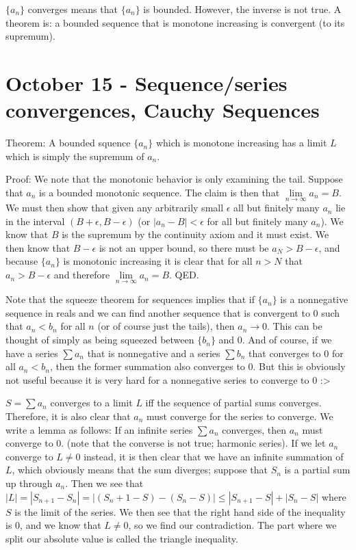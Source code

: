 \documentclass{report}
\begin{document}
$\{a_n\}$ converges means that $\{a_n\}$ is bounded. However, the inverse is not true. A theorem is: a bounded sequence that is monotone increasing is convergent (to its supremum).

\chapter{October 15 - Sequence/series convergences, Cauchy Sequences}

Theorem: A bounded squence $\{a_n\}$ which is monotone increasing has a limit $L$ which is simply the supremum of $a_n$. 

Proof: We note that the monotonic behavior is only examining the tail. Suppose that $a_n$ is a bounded monotonic sequence. The claim is then that $\displaystyle\lim\limits_{n \to\infty}{a_n} = B$. We must then show that given any arbitrarily small $\epsilon$ all but finitely many $a_n$ lie in the interval $(B + \epsilon, B - \epsilon)$ (or $|a_n - B| < \epsilon$ for all but finitely many $a_n$). We know that $B$ is the supremum by the continuity axiom and it must exist. We then know that $B - \epsilon$ is not an upper bound, so there must be $a_N > B - \epsilon$, and because $\{a_n\}$ is monotonic increasing it is clear that for all $n > N$ that $a_n > B - \epsilon$ and therefore $\displaystyle\lim\limits_{n \to\infty}{a_n} = B$. QED.

Note that the squeeze theorem for sequences implies that if $\{a_n\}$ is a nonnegative sequence in reals and we can find another sequence that is convergent to $0$ such that $a_n < b_n$ for all $n$ (or of course just the tails), then $a_n \to 0$. This can be thought of simply as being squeezed between $\{b_n\}$ and $0$. And of course, if we have a series $\sum{a_n}$ that is nonnegative and a series $\sum{b_n}$ that converges to $0$ for all $a_n < b_n$, then the former summation also converges to $0$. But this is obviously not useful because it is very hard for a nonnegative series to converge to $0$ :>

$S = \sum{a_n}$ converges to a limit $L$ iff the sequence of partial sums converges. Therefore, it is also clear that $a_n$ must converge for the series to converge. We write a lemma as follows: If an infinite series $\sum{a_n}$ converges, then $a_n$ must converge to $0$. (note that the converse is not true; harmonic series). If we let $a_n$ converge to $L \neq 0$ instead, it is then clear that we have an infinite summation of $L$, which obviously means that the sum diverges; suppose that $S_n$ is a partial sum up through $a_n$. Then we see that $|L| = |S_{n+1} - S_n| = |(S_n+1 - S)-(S_n - S)| \leq |S_{n+1} - S| + |S_n - S|$ where $S$ is the limit of the series. We then see that the right hand side of the inequality is $0$, and we know that $L \neq 0$, so we find our contradiction. The part where we split our absolute value is called the triangle inequality.
\end{document}
